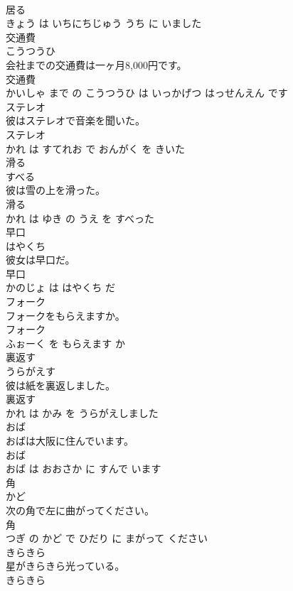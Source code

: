 \documentclass[8pt]{extreport}
\begin{document}
\begin{CJK}{UTF8}{min}
\\	居る 
\\	きょう は いちにちじゅう うち に いました			
\\	交通費	
\\	こうつうひ			
\\	会社までの交通費は一ヶ月8,000円です。	
\\	交通費 
\\	かいしゃ まで の こうつうひ は いっかげつ はっせんえん です			
\\	ステレオ	
\\	彼はステレオで音楽を聞いた。	
\\	ステレオ 
\\	かれ は すてれお で おんがく を きいた			
\\	滑る	
\\	すべる			
\\	彼は雪の上を滑った。	
\\	滑る 
\\	かれ は ゆき の うえ を すべった			
\\	早口	
\\	はやくち			
\\	彼女は早口だ。	
\\	早口 
\\	かのじょ は はやくち だ			
\\	フォーク	
\\	フォークをもらえますか。	
\\	フォーク 
\\	ふぉーく を もらえます か			
\\	裏返す	
\\	うらがえす			
\\	彼は紙を裏返しました。	
\\	裏返す 
\\	かれ は かみ を うらがえしました			
\\	おば	
\\	おばは大阪に住んでいます。	
\\	おば 
\\	おば は おおさか に すんで います			
\\	角	
\\	かど			
\\	次の角で左に曲がってください。	
\\	角 
\\	つぎ の かど で ひだり に まがって ください			
\\	きらきら	
\\	星がきらきら光っている。	
\\	きらきら 

\end{CJK}
\end{document}
